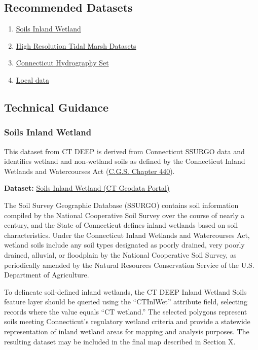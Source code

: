 \documentclass[
  letterpaper,
  DIV=11,
  numbers=noendperiod]{scrreprt}
\providecommand{\tightlist}{%
  \setlength{\itemsep}{0pt}\setlength{\parskip}{0pt}}
\begin{document}
\subsection{Recommended Datasets}\label{recommended-datasets-2}

\begin{enumerate}
\def\labelenumi{\arabic{enumi}.}
\tightlist
\item
  \hyperref[sec-soils-inland-wetland]{Soils Inland Wetland}
\item
  \hyperref[sec-high-resolution-tidal-marsh-datasets]{High Resolution
  Tidal Marsh Datasets}
\item
  \hyperref[sec-connecticut-hydrography-set]{Connecticut Hydrography
  Set}
\item
  \hyperref[sec-local-data3]{Local data}
\end{enumerate}

\subsection{Technical Guidance}\label{technical-guidance-2}

\subsubsection{Soils Inland Wetland}\label{sec-soils-inland-wetland}

This dataset from CT DEEP is derived from Connecticut SSURGO data and
identifies wetland and non‑wetland soils as defined by the Connecticut
Inland Wetlands and Watercourses Act
(\href{https://www.cga.ct.gov/2019/pub/chap_440.htm}{C.G.S. Chapter
440}).

\textbf{Dataset:}
\href{https://geodata.ct.gov/datasets/CTDEEP::soils-inland-wetland/about}{Soils
Inland Wetland (CT Geodata Portal)}

The Soil Survey Geographic Database (SSURGO) contains soil information
compiled by the National Cooperative Soil Survey over the course of
nearly a century, and the State of Connecticut defines inland wetlands
based on soil characteristics. Under the Connecticut Inland Wetlands and
Watercourses Act, wetland soils include any soil types designated as
poorly drained, very poorly drained, alluvial, or floodplain by the
National Cooperative Soil Survey, as periodically amended by the Natural
Resources Conservation Service of the U.S. Department of Agriculture.

To delineate soil-defined inland wetlands, the CT DEEP Inland Wetland
Soils feature layer should be queried using the ``CTInlWet'' attribute
field, selecting records where the value equals ``CT wetland.'' The
selected polygons represent soils meeting Connecticut's regulatory
wetland criteria and provide a statewide representation of inland
wetland areas for mapping and analysis purposes. The resulting dataset
may be included in the final map described in Section X.\\
\end{document}
